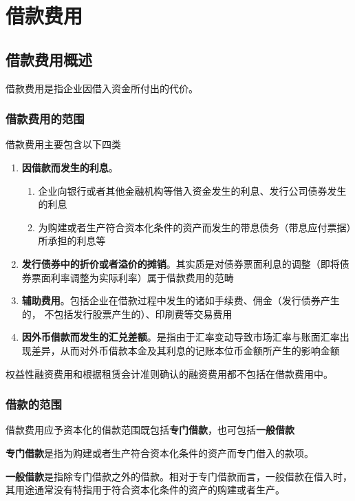 \documentclass[UTF8,12pt]{ctexart}
\numberwithin{equation}{section} %
\numberwithin{figure}{section}
\numberwithin{table}{section}
\begin{document}
	\newpage
	\section{借款费用}
	
	\subsection{借款费用概述}
	借款费用是指企业因借入资金所付出的代价。
	
	\subsubsection{借款费用的范围}
	借款费用主要包含以下四类
	\begin{enumerate}
		\item \textbf{因借款而发生的利息}。
		\begin{enumerate}
			\item 企业向银行或者其他金融机构等借入资金发生的利息、发行公司债券发生的利息
			
			\item 为购建或者生产符合资本化条件的资产而发生的带息债务（带息应付票据）所承担的利息等
		\end{enumerate}
		
		\item \textbf{发行债券中的折价或者溢价的摊销}。其实质是对债券票面利息的调整（即将债券票面利率调整为实际利率）属于借款费用的范畴
		
		\item \textbf{辅助费用}。包括企业在借款过程中发生的诸如手续费、佣金（发行债券产生的， 不包括发行股票产生的）、印刷费等交易费用
		
		\item \textbf{因外币借款而发生的汇兑差额}。是指由于汇率变动导致市场汇率与账面汇率出现差异，从而对外币借款本金及其利息的记账本位币金额所产生的影响金额
	\end{enumerate}
	
	权益性融资费用和根据租赁会计准则确认的融资费用都不包括在借款费用中。
	
	\subsubsection{借款的范围}
	借款费用应予资本化的借款范围既包括\textbf{专门借款}，也可包括\textbf{一般借款}
	
	\textbf{专门借款}是指为购建或者生产符合资本化条件的资产而专门借入的款项。
	
	\textbf{一般借款}是指除专门借款之外的借款。相对于专门借款而言，一般借款在借入时， 其用途通常没有特指用于符合资本化条件的资产的购建或者生产。
	
\end{document}

